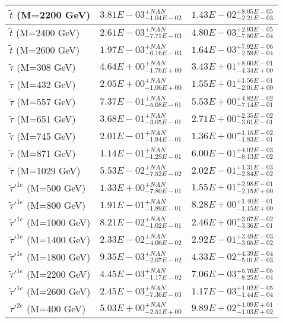 \documentclass{article}
\begin{document}
\begin{center}
\begin{tabular}{ |l|c|c| }
 \hline
 $\tilde{t}$ (M=2200 GeV) & $3.81E-03^{+NAN}_{-1.04E-02}$ & $1.43E-02^{+8.05E-05}_{-2.21E-03}$ \\
 \hline
 $\tilde{t}$ (M=2400 GeV) & $2.61E-03^{+NAN}_{-7.71E-03}$ & $4.80E-03^{+2.93E-05}_{-7.50E-04}$ \\
 \hline
 $\tilde{t}$ (M=2600 GeV) & $1.97E-03^{+NAN}_{-6.16E-03}$ & $1.64E-03^{+7.92E-06}_{-2.59E-04}$ \\
 \hline
 $\tilde{\tau}$ (M=308 GeV) & $4.64E+00^{+NAN}_{-1.76E+00}$ & $3.43E+01^{+8.60E-01}_{-4.34E+00}$ \\
 \hline
 $\tilde{\tau}$ (M=432 GeV) & $2.05E+00^{+NAN}_{-1.06E+00}$ & $1.55E+01^{+1.56E-01}_{-2.01E+00}$ \\
 \hline
 $\tilde{\tau}$ (M=557 GeV) & $7.37E-01^{+NAN}_{-5.08E-01}$ & $5.53E+00^{+4.82E-02}_{-7.14E-01}$ \\
 \hline
 $\tilde{\tau}$ (M=651 GeV) & $3.68E-01^{+NAN}_{-3.05E-01}$ & $2.71E+00^{+2.35E-02}_{-3.61E-01}$ \\
 \hline
 $\tilde{\tau}$ (M=745 GeV) & $2.01E-01^{+NAN}_{-1.94E-01}$ & $1.36E+00^{+1.15E-02}_{-1.83E-01}$ \\
 \hline
 $\tilde{\tau}$ (M=871 GeV) & $1.14E-01^{+NAN}_{-1.29E-01}$ & $6.00E-01^{+4.02E-03}_{-8.13E-02}$ \\
 \hline
 $\tilde{\tau}$ (M=1029 GeV) & $5.53E-02^{+NAN}_{-7.52E-02}$ & $2.02E-01^{+1.31E-03}_{-2.84E-02}$ \\
 \hline
 $\tilde{\tau}'^{1e}$ (M=500 GeV) & $1.33E+00^{+NAN}_{-7.80E-01}$ & $1.55E+01^{+2.98E-01}_{-2.15E+00}$ \\
 \hline
 $\tilde{\tau}'^{1e}$ (M=800 GeV) & $1.91E-01^{+NAN}_{-1.89E-01}$ & $8.28E+00^{+1.40E-01}_{-1.15E+00}$ \\
 \hline
 $\tilde{\tau}'^{1e}$ (M=1000 GeV) & $8.21E-02^{+NAN}_{-1.02E-01}$ & $2.46E+00^{+3.67E-02}_{-3.36E-01}$ \\
 \hline
 $\tilde{\tau}'^{1e}$ (M=1400 GeV) & $2.33E-02^{+NAN}_{-4.06E-02}$ & $2.92E-01^{+3.49E-03}_{-3.65E-02}$ \\
 \hline
 $\tilde{\tau}'^{1e}$ (M=1800 GeV) & $9.35E-03^{+NAN}_{-2.07E-02}$ & $4.33E-02^{+4.39E-04}_{-5.01E-03}$ \\
 \hline
 $\tilde{\tau}'^{1e}$ (M=2200 GeV) & $4.45E-03^{+NAN}_{-1.17E-02}$ & $7.06E-03^{+5.76E-05}_{-8.25E-04}$ \\
 \hline
 $\tilde{\tau}'^{1e}$ (M=2600 GeV) & $2.45E-03^{+NAN}_{-7.36E-03}$ & $1.17E-03^{+1.02E-05}_{-1.44E-04}$ \\
 \hline
 $\tilde{\tau}'^{2e}$ (M=400 GeV) & $5.03E+00^{+NAN}_{-2.51E+00}$ & $9.89E+02^{+1.09E+01}_{-1.03E+02}$ \\

\end{tabular}
\end{center}
\end{document}
